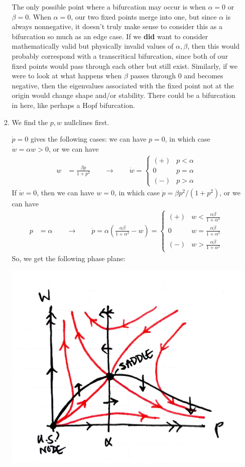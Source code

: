 \documentclass[10pt,letterpaper]{report}
\newcommand{\so}{\qquad \rightarrow \qquad}
\begin{document}
\begin{enumerate}
\begin{enumerate}
    The only possible point where a bifurcation may occur is when $\alpha = 0$ or $\beta = 0$. When $\alpha = 0$, our two fixed points merge into one, but since $\alpha$ is always nonnegative, it doesn't truly make sense to consider this as a bifurcation so much as an edge case. If we \textbf{did} want to consider mathematically valid but physically invalid values of $\alpha, \beta$, then this would probably correspond with a transcritical bifurcation, since both of our fixed points would pass through each other but still exist. Similarly, if we were to look at what happens when $\beta$ passes through 0 and becomes negative, then the eigenvalues associated with the fixed point not at the origin would change shape and/or stability. There could be a bifurcation in here, like perhaps a Hopf bifurcation.
    
    \item We find the $p, w$ nullclines first.
    
    $\dot p = 0$ gives the following cases: we can have $p = 0$, in which case $\dot w = \alpha w > 0$, or we can have
    \begin{align*}
        w &= \frac{\beta p}{1 + p^2} \so \dot w = \begin{cases}
        (+) &p < \alpha \\ 0 & p = \alpha \\ (-) &p > \alpha 
        \end{cases}
    \end{align*}
    If $\dot w = 0$, then we can have $w = 0$, in which case $\dot p = \beta p^2/(1 + p^2)$, or we can have 
    \begin{align*}
        p &= \alpha \so \dot p = \alpha\left(\frac{\alpha \beta}{1 + \alpha^2} - w\right) = \begin{cases}
        (+) &w < \frac{\alpha \beta}{1 + \alpha^2} \\ 0 & w = \frac{\alpha \beta}{1 + \alpha^2} \\ (-) &w > \frac{\alpha \beta}{1 + \alpha^2} 
        \end{cases}
    \end{align*}
    So, we get the following phase plane:
    \begin{center}
    \includegraphics[height=0.3\textwidth]{img/2017S2.png}
    \end{center}
\end{enumerate}


\end{enumerate}
\end{document}
